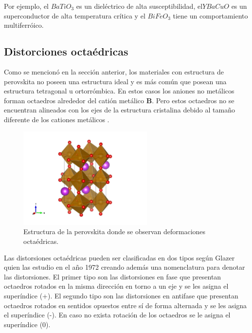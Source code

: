 \noindent Por ejemplo, el $BaTiO_{3}$ es un diel\'ectrico de alta  susceptibilidad, el$YBaCuO$ es un superconductor de alta temperatura cr\'itica y el $BiFeO_{3}$ tiene un comportamiento multiferr\'oico.


\subsection{Distorciones octa\'edricas}

Como se mencion\'o en la secci\'on anterior, los materiales con estructura de perovskita no poseen una estructura ideal y es m\'as com\'un que posean una estructura tetragonal u ortorr\'ombica. En estos casos los aniones no met\'alicos forman octaedros alrededor del cati\'on met\'alico {\bf B}. Pero estos octaedros no se encuentran alineados con los ejes de la estructura cristalina debido al tama\~no diferente de los cationes met\'alicos \cite{inigues2001}.


\begin{figure}[H]
    \centering
    \includegraphics[width=0.6\textwidth]{contenido/marco_teorico/perovskitas/img_Perovskitas/octaedro_perovs.png}
    \caption[Deformaci\'on octaedrica de la perovskita]{Estructura de la 
        perovskita donde se observan 
        deformaciones octa\'edricas.}
    \label{perovskita_octaedro}
\end{figure}

\noindent Las distorsiones octa\'edricas pueden ser clasificadas en dos tipos seg\'un Glazer quien las estudio en el a\~no 1972 creando adem\'as una nomenclatura para denotar las distorsiones. El primer tipo son las distorsiones en fase que presentan octaedros rotados en la misma direcci\'on en torno a un eje y se les asigna el super\'indice (+). El segundo tipo son las distorsiones en antifase que presentan octaedros rotados en sentidos opuestos entre s\'i de forma alternada y se les asigna el super\'indice (-). En caso no exista rotaci\'on de los octaedros se le asigna el super\'indice (0).

